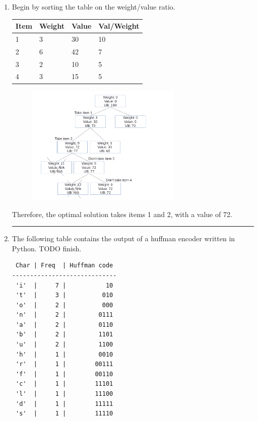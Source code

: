 \documentclass{article}
\begin{document}
\begin{enumerate}
\noindent\rule{8cm}{0.4pt}

\item Begin by sorting the table on the weight/value ratio. 

\begin{table}[H]
\begin{tabular}{|l|l|l|l|}
\hline
Item & Weight & Value & Val/Weight \\ \hline
1 & 3 & 30 & 10 \\ \hline
2 & 6 & 42 & 7 \\ \hline
3 & 2 & 10 & 5 \\ \hline
4 & 3 & 15 & 5 \\ \hline
\end{tabular}
\end{table}


\begin{figure}[H]
        \centering
	\includegraphics[width=0.7\textwidth]{P8/branchandbound}
\end{figure}

Therefore, the optimal solution takes items 1 and 2, with a value of 72. 

\noindent\rule{8cm}{0.4pt}

\item The following table contains the output of a huffman encoder written in Python. TODO finish.
\begin{lstlisting}
 Char | Freq  | Huffman code
-----------------------------
 'i'  |     7 |           10
 't'  |     3 |          010
 'o'  |     2 |          000
 'n'  |     2 |         0111
 'a'  |     2 |         0110
 'b'  |     2 |         1101
 'u'  |     2 |         1100
 'h'  |     1 |         0010
 'r'  |     1 |        00111
 'f'  |     1 |        00110
 'c'  |     1 |        11101
 'l'  |     1 |        11100
 'd'  |     1 |        11111
 's'  |     1 |        11110


\end{lstlisting}
\end{enumerate}
\end{document}
